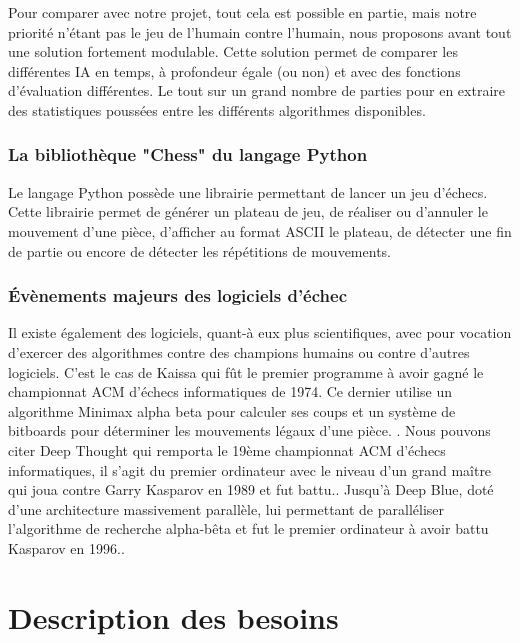 \documentclass{article}
\begin{document}
Pour comparer avec notre projet, tout cela est possible en partie, mais notre priorité n'étant pas le jeu de l'humain contre l'humain, nous proposons avant tout une solution fortement modulable. Cette solution permet de comparer les différentes IA en temps, à profondeur égale (ou non) et avec des fonctions d'évaluation différentes. Le tout sur un grand nombre de parties pour en extraire des statistiques poussées entre les différents algorithmes disponibles.
\newline

\subsubsection{La bibliothèque "Chess" du langage Python} \label{python}
Le langage Python possède une librairie permettant de lancer un jeu d'échecs. Cette librairie permet de générer un plateau de jeu, de réaliser ou d'annuler le mouvement d'une pièce, d'afficher au format ASCII le plateau, de détecter une fin de partie ou encore de détecter les répétitions de mouvements.

\subsubsection{Évènements majeurs des logiciels d'échec}

Il existe également des logiciels, quant-à eux plus scientifiques, avec pour vocation d'exercer des algorithmes contre des champions humains ou contre d'autres logiciels.
\newline
C'est le cas de Kaissa qui fût le premier programme à avoir gagné le championnat ACM d'échecs informatiques de 1974. Ce dernier utilise un algorithme Minimax alpha beta \cite{KaissaAB} pour calculer ses coups et un système de bitboards pour déterminer les mouvements légaux d'une pièce. \cite{Kaissa}\cite{KaissaBitboard}\cite{RotatedBitBoards}.
\newline
Nous pouvons citer Deep Thought qui remporta le 19ème championnat ACM d'échecs informatiques, il s'agit du premier ordinateur avec le niveau d'un grand maître qui joua contre Garry Kasparov en 1989 et fut battu.\cite{Deep}. 
\newline
Jusqu'à Deep Blue, doté d'une architecture massivement parallèle, lui permettant de paralléliser l'algorithme de recherche alpha-bêta\cite{DeepSystem} et fut le premier ordinateur à avoir battu Kasparov en 1996.\cite{Deep}.

\section{Description des besoins}
\end{document}
